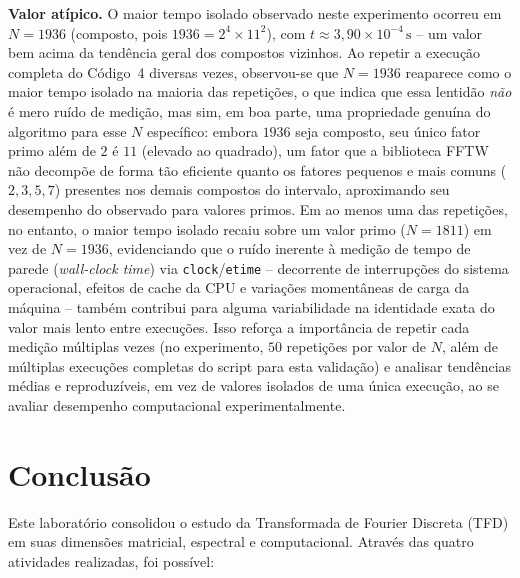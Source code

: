 \documentclass[tcc]{classe_uftex/uftex}
\begin{document}
\textbf{Valor atípico.} O maior tempo isolado observado neste experimento ocorreu em $N=1936$ (composto, pois $1936 = 2^4 \times 11^2$), com $t \approx 3{,}90\times10^{-4}\,\text{s}$ -- um valor bem acima da tendência geral dos compostos vizinhos. Ao repetir a execução completa do Código~4 diversas vezes, observou-se que $N=1936$ reaparece como o maior tempo isolado na maioria das repetições, o que indica que essa lentidão \emph{não} é mero ruído de medição, mas sim, em boa parte, uma propriedade genuína do algoritmo para esse $N$ específico: embora $1936$ seja composto, seu único fator primo além de $2$ é $11$ (elevado ao quadrado), um fator que a biblioteca FFTW não decompõe de forma tão eficiente quanto os fatores pequenos e mais comuns ($2,3,5,7$) presentes nos demais compostos do intervalo, aproximando seu desempenho do observado para valores primos. Em ao menos uma das repetições, no entanto, o maior tempo isolado recaiu sobre um valor primo ($N=1811$) em vez de $N=1936$, evidenciando que o ruído inerente à medição de tempo de parede (\emph{wall-clock time}) via \texttt{clock}/\texttt{etime} -- decorrente de interrupções do sistema operacional, efeitos de cache da CPU e variações momentâneas de carga da máquina -- também contribui para alguma variabilidade na identidade exata do valor mais lento entre execuções. Isso reforça a importância de repetir cada medição múltiplas vezes (no experimento, $50$ repetições por valor de $N$, além de múltiplas execuções completas do script para esta validação) e analisar tendências médias e reproduzíveis, em vez de valores isolados de uma única execução, ao se avaliar desempenho computacional experimentalmente.

\chapter{Conclusão}

Este laboratório consolidou o estudo da Transformada de Fourier Discreta (TFD) em suas dimensões matricial, espectral e computacional. Através das quatro atividades realizadas, foi possível:
\end{document}
